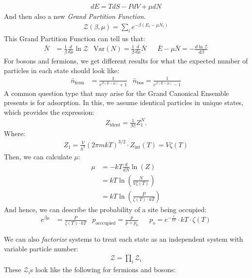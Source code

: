 \documentclass{article}
\begin{document}
\begin{align*}
  dE = TdS - PdV + \mu dN
\end{align*}
And then also a new \textit{Grand Partition Function}.
\begin{align*}
  \mathcal{Z}(\beta, \mu) = \sum_i e^{-\beta(E_i - \mu N_i)}
\end{align*}
This Grand Partition Function can tell us that:
\begin{align*}
  \bar{N} &= \frac{1}{\beta}\frac{d}{d\mu}\ln\mathcal{Z} & \text{Var}(N) = \frac{1}{\beta} \frac{d}{d\mu} \bar{N} && \bar{E} - \mu\bar{N} = -\frac{d \ln \mathcal{Z}}{d\beta}
\end{align*}
For bosons and fermions, we get different results for what the expected number of particles in each state should look like:
\begin{align*}
  \bar{n}_\text{ferm} &= \frac{1}{e^{\beta(E-\mu)} + 1} & \bar{n}_\text{bos} = \frac{1}{e^{\beta(E-\mu)} - 1}
\end{align*}
 A common question type that may arise for the Grand Canonical Ensemble presents is for adsorption. In this, we assume identical particles in unique states, which provides the expression:
\begin{align*}
  Z_\text{ident} = \frac{1}{N!}Z_1^N.
\end{align*}
Where:
\begin{align*}
  Z_1 = \frac{V}{h^3}(2\pi m kT)^{3/2}\cdot Z_\text{int}(T) = V \zeta(T)
\end{align*}
Then, we can calculate $\mu$:
\begin{align*}
  \mu &= -kT \frac{d}{dN} \ln(Z)\\
  &= kT \ln \left(\frac{N}{V\zeta(T)}\right)\\
  &= kT \ln \left(\frac{P}{\zeta(T) \cdot kT}\right)
\end{align*}
And hence, we can describe the probability of a site being occupied:
\begin{align*}
  e^{\beta\mu} &= \frac{P}{\zeta(T) \cdot kT} & p_\text{occcupied} = \frac{p}{p+p_0} && p_o = e^{-\frac{\epsilon}{kT}}\cdot kT \cdot \zeta(T)
\end{align*}

We can also \textit{factorize} systems to treat each state as an independent system with variable particle number:
\begin{align*}
  \mathcal{Z} = \prod_i \mathcal{Z}_i
\end{align*}
These $\mathcal{Z}_i$s look like the following for fermions and bosons:
\end{document}
